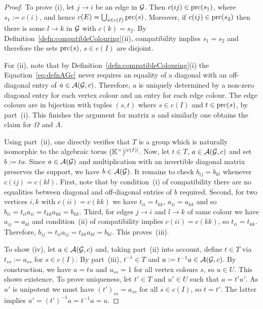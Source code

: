 \begin{proof}
	To prove (i), let $j \to i$ be an edge in $\mathcal{G}$. Then $c(ij) \in \operatorname{prc}(s_1)$, where $s_1 := c(i)$, and hence $c(E) = \bigcup_{s \in c(I)} \operatorname{prc}(s)$. Moreover, if $c(ij) \in \operatorname{prc}(s_2)$ then there is some $l \to k$ in $\mathcal{G}$ with $c(k) = s_2$. By Definition~\ref{defn:compatibleColouring}(ii), compatibility implies $s_1 = s_2$ and therefore the sets $\operatorname{prc}(s)$, $s \in c(I)$ are disjoint.
	
	For (ii), note that by Definition~\ref{defn:compatibleColouring}(i) the Equation~\eqref{eq:defnAGc} never requires an equality of a diagonal with an off-diagonal entry of $a \in \mathcal{A}(\mathcal{G}, c)$. Therefore, $a$ is uniquely determined by a non-zero diagonal entry for each vertex colour and an entry for each edge colour. The edge colours are in bijection with tuples $(s,t)$ where $s \in c(I)$ and $t \in \operatorname{prc}(s)$, by part~(i). This finishes the argument for matrix $a$ and similarly one obtains the claim for $\Omega$ and $\Lambda$.
	
	Using part~(ii), one directly verifies that $T$ is a group which is naturally isomorphic to the algebraic torus $(\mathbb K^{\times})^{|c(I)|}$.
	Now, let $t \in T$, $a \in \mathcal{A}(\mathcal{G}, c)$ and set $b := ta$. Since $a \in \mathcal{A}(\mathcal{G})$ and multiplication with an invertible diagonal matrix preserves the support, we have $b \in \mathcal{A}(\mathcal{G})$. It remains to check $b_{ij} = b_{kl}$ whenever $c(ij) = c(kl)$. First, note that by condition~(i) of compatibility there are no equalities between diagonal and off-diagonal entries of $b$ required. Second, for two vertices $i,k$ with $c(ii) = c(kk)$ we have $t_{ii} = t_{kk}$, $a_{ii} = a_{kk}$ and so $b_{ii} = t_{ii} a_{ii} = t_{kk} a_{kk} = b_{kk}$. Third, for edges $j \to i$ and $l \to k$ of same colour we have $a_{ij} = a_{kl}$ and condition~(ii) of compatibility implies $c(ii) = c(kk)$, so $t_{ii} = t_{kk}$. Therefore, $b_{ij} = t_{ii} a_{ij} = t_{kk} a_{kl} = b_{kl}$. This proves~(iii).
	
	To show (iv), let $a \in \mathcal{A}(\mathcal{G}, c)$ and, taking part~(ii) into account, define $t \in T$ via $t_{ss} := a_{ss}$ for $s \in c(I)$. By part~(iii), $t^{-1} \in T$ and $u := t^{-1} a \in \mathcal{A}(\mathcal{G}, c)$. By construction, we have $a = tu$ and $u_{ss} = 1$ for all vertex colours $s$, so $u \in U$. This shows existence. To prove uniqueness, let $t' \in T$ and $u' \in U$ such that $a = t' u'$. As $u'$ is unipotent we must have $(t')_{ss} = a_{ss}$ for all $s \in c(I)$, so $t = t'$. The latter implies $u' = (t')^{-1} a = t^{-1} a = u$.
	

\end{proof}

